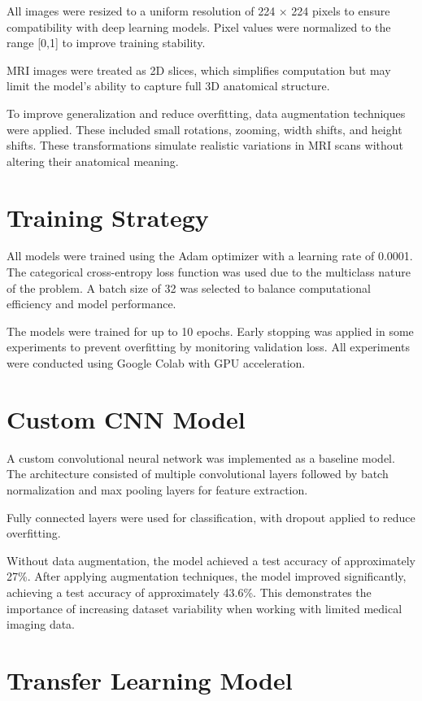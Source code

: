 \documentclass[12pt]{article}
\begin{document}
All images were resized to a uniform resolution of 224 × 224 pixels to ensure compatibility with deep learning models. Pixel values were normalized to the range [0,1] to improve training stability.

MRI images were treated as 2D slices, which simplifies computation but may limit the model’s ability to capture full 3D anatomical structure.

To improve generalization and reduce overfitting, data augmentation techniques were applied. These included small rotations, zooming, width shifts, and height shifts. These transformations simulate realistic variations in MRI scans without altering their anatomical meaning.

\section{Training Strategy}

All models were trained using the Adam optimizer with a learning rate of 0.0001. The categorical cross-entropy loss function was used due to the multiclass nature of the problem. A batch size of 32 was selected to balance computational efficiency and model performance.

The models were trained for up to 10 epochs. Early stopping was applied in some experiments to prevent overfitting by monitoring validation loss. All experiments were conducted using Google Colab with GPU acceleration.

\section{Custom CNN Model}

A custom convolutional neural network was implemented as a baseline model. The architecture consisted of multiple convolutional layers followed by batch normalization and max pooling layers for feature extraction.

Fully connected layers were used for classification, with dropout applied to reduce overfitting.

Without data augmentation, the model achieved a test accuracy of approximately 27\%. After applying augmentation techniques, the model improved significantly, achieving a test accuracy of approximately 43.6\%. This demonstrates the importance of increasing dataset variability when working with limited medical imaging data.

\section{Transfer Learning Model}
\end{document}
